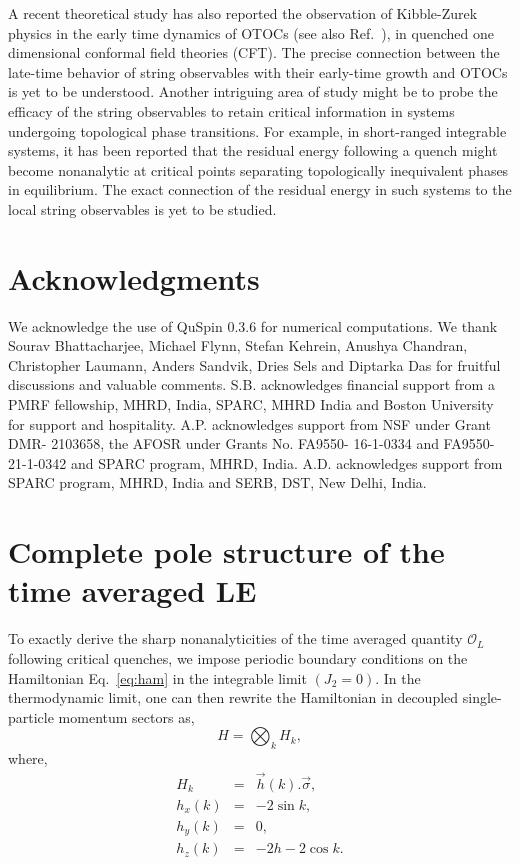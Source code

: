 \documentclass[aps,prx,twocolumn]{revtex4-2}
\begin{document}
{{A recent theoretical study \cite{diptarka21} has also reported the observation of Kibble-Zurek physics in the early time dynamics of OTOCs (see also Ref.~\cite{heyl18}), in quenched one dimensional conformal field theories (CFT). The precise connection between the late-time behavior of string observables with their early-time growth and OTOCs is yet to be understood. Another intriguing area of study might be to probe the efficacy of the string observables to retain critical information in systems undergoing topological phase transitions. For example, in short-ranged integrable systems, it has been reported \cite{Bhattacharyya15,sroy17} that the residual energy following a quench might become nonanalytic at critical points separating topologically inequivalent phases in equilibrium. The exact connection of the residual energy in such systems to the local string observables is yet to be studied.

\section*{Acknowledgments}
We acknowledge the use of QuSpin 0.3.6	for numerical computations. We thank Sourav Bhattacharjee, Michael Flynn, Stefan Kehrein, Anushya Chandran, Christopher Laumann, Anders Sandvik, Dries Sels and Diptarka Das for fruitful discussions and valuable comments. S.B. acknowledges financial support from a PMRF fellowship, MHRD, India, SPARC, MHRD India and Boston University for support and hospitality. A.P. acknowledges support from NSF under Grant DMR- 2103658, the AFOSR under Grants No. FA9550- 16-1-0334 and FA9550-21-1-0342  and SPARC program, MHRD, India.  A.D. acknowledges support from SPARC program, MHRD, India and SERB, DST, New Delhi, India.

	

\appendix

\section{Complete pole structure of the time averaged LE}
\label{Sec:Appendix_1}

To exactly derive the sharp nonanalyticities of the time averaged quantity $\mathcal{O}_L$ following critical quenches, we impose periodic boundary conditions on the Hamiltonian Eq.~\eqref{eq:ham} in the integrable limit $(J_2=0)$. In the thermodynamic limit, one can then rewrite the Hamiltonian in decoupled single-particle momentum sectors as,
\begin{equation}
	H=\bigotimes_{k}H_k,
\end{equation}
where,
\begin{eqnarray}\label{eq_a:hamil}
	\nonumber H_k&=&\vec{h}(k).\vec{\sigma},\\
	\nonumber h_x(k)&=&-2\sin{k},\\
	\nonumber h_y(k)&=&0,\\
	h_z(k)&=&-2h-2\cos{k}.
\end{eqnarray}

}}
\end{document}
